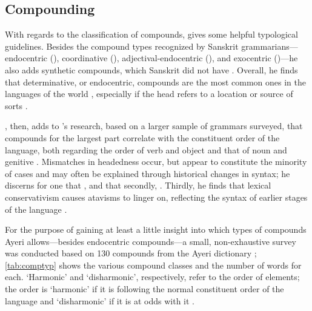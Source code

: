 
\subsection{Compounding}
\label{subsec:compounds}

With regards to the classification of compounds, \citet{bauer2001} gives some 
helpful typological guidelines. Besides the compound types recognized by 
Sanskrit grammarians---endocentric (), coordinative 
(), adjectival-endo\-cent\-ric (), and 
exocentric ()---he also adds synthetic compounds, which Sanskrit 
did not have \citep[697]{bauer2001}. Overall, he finds that determinative, or 
endocentric, compounds are the most common ones in the languages of the world 
\citep[697]{bauer2001}, especially if the head refers to a location or source 
of sorts \citep[702]{bauer2001}.

\citet{gaeta2008}, then, adds to \citet{bauer2001}'s research, based on a
larger sample of grammars surveyed, that compounds for the largest part
correlate with the constituent order of the language, both regarding the order
of verb and object and that of noun and genitive \citep[129--133]{gaeta2008}.
Mismatches in headedness occur, but appear to constitute the minority of cases
and may often be explained through historical changes in syntax; he discerns
for one that , and that secondly, . Thirdly, he
finds that lexical conservativism causes atavisms to linger on, reflecting the
syntax of earlier stages of the language \citep[138--139]{gaeta2008}.

For the purpose of gaining at least a little insight into which
types of compounds Ayeri allows---besides endocentric
compounds---a small, non-exhaustive survey was conducted based on 130 compounds
from the Ayeri dictionary \citep[Dictionary]{benung}; \autoref{tab:comptyp}
shows the various compound classes and the number of words for each. `Harmonic'
and `disharmonic', respectively, refer to the order of elements; the order is
`harmonic' if it is following the normal constituent order of the language and
`disharmonic' if it is at odds with it \citep{gaeta2008}.

